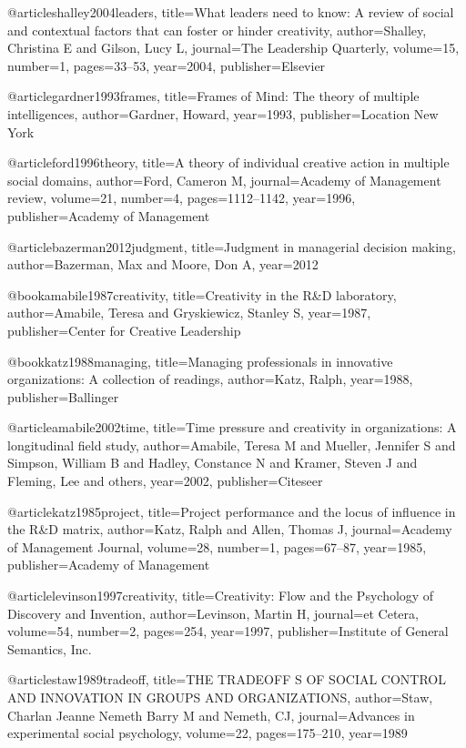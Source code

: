 @article{shalley2004leaders,
  title={What leaders need to know: A review of social and contextual factors that can foster or hinder creativity},
  author={Shalley, Christina E and Gilson, Lucy L},
  journal={The Leadership Quarterly},
  volume={15},
  number={1},
  pages={33--53},
  year={2004},
  publisher={Elsevier}
}

@article{gardner1993frames,
  title={Frames of Mind: The theory of multiple intelligences},
  author={Gardner, Howard},
  year={1993},
  publisher={Location New York}
}

@article{ford1996theory,
  title={A theory of individual creative action in multiple social domains},
  author={Ford, Cameron M},
  journal={Academy of Management review},
  volume={21},
  number={4},
  pages={1112--1142},
  year={1996},
  publisher={Academy of Management}
}

@article{bazerman2012judgment,
  title={Judgment in managerial decision making},
  author={Bazerman, Max and Moore, Don A},
  year={2012}
}

@book{amabile1987creativity,
  title={Creativity in the R\&D laboratory},
  author={Amabile, Teresa and Gryskiewicz, Stanley S},
  year={1987},
  publisher={Center for Creative Leadership}
}

@book{katz1988managing,
  title={Managing professionals in innovative organizations: A collection of readings},
  author={Katz, Ralph},
  year={1988},
  publisher={Ballinger}
}

@article{amabile2002time,
  title={Time pressure and creativity in organizations: A longitudinal field study},
  author={Amabile, Teresa M and Mueller, Jennifer S and Simpson, William B and Hadley, Constance N and Kramer, Steven J and Fleming, Lee and others},
  year={2002},
  publisher={Citeseer}
}

@article{katz1985project,
  title={Project performance and the locus of influence in the R\&D matrix},
  author={Katz, Ralph and Allen, Thomas J},
  journal={Academy of Management Journal},
  volume={28},
  number={1},
  pages={67--87},
  year={1985},
  publisher={Academy of Management}
}

@article{levinson1997creativity,
  title={Creativity: Flow and the Psychology of Discovery and Invention},
  author={Levinson, Martin H},
  journal={et Cetera},
  volume={54},
  number={2},
  pages={254},
  year={1997},
  publisher={Institute of General Semantics, Inc.}
}

@article{staw1989tradeoff,
  title={THE TRADEOFF S OF SOCIAL CONTROL AND INNOVATION IN GROUPS AND ORGANIZATIONS},
  author={Staw, Charlan Jeanne Nemeth Barry M and Nemeth, CJ},
  journal={Advances in experimental social psychology},
  volume={22},
  pages={175--210},
  year={1989}
}

